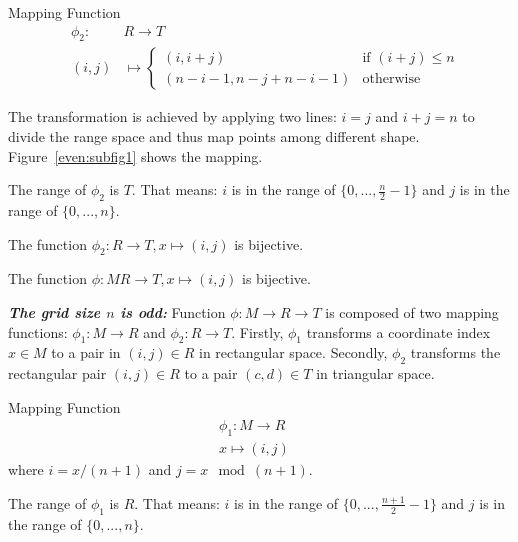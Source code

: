 \documentclass[AMA,LATO1COL]{WileyNJD-v2}
\begin{document}
\begin{definition}
Mapping Function
\begin{eqnarray}
&\phi_2:&   R \rightarrow  T  \\
&(i,j)& \mapsto
  \begin{cases}
   (i,i+j) & \text{if } (i+j) \leq n \\
   (n-i-1,n-j+n-i-1) & \text{otherwise}
  \end{cases}
\end{eqnarray}
\end{definition}
The transformation is achieved by applying two lines: $i=j$ and $i+j=n$ to divide the range space and thus map points among different shape. Figure~\ref{even:subfig1} shows the mapping.

\vspace{5mm}
\begin{lemma}
The range of $\phi_2$ is $T$. That means: $i$ is in the range of  $\{0,...,\frac{n}{2}-1\}$ and $j$ is in the range of $\{0,...,n\}$.
\end{lemma}
\vspace{5mm}
\begin{lemma}
The function $\phi_2:   R \rightarrow  T,x \mapsto (i,j)$ is bijective.
\end{lemma}
\vspace{5mm}
\begin{corollary}
The function $\phi:   M   R \rightarrow  T,x \mapsto (i,j)$ is bijective.
\end{corollary}
\vspace{5mm}
\noindent \textbf{\textit{The grid size $n$ is odd:}} Function $\phi:  M \rightarrow  R \rightarrow  T$ is composed of two mapping functions: $\phi_1:  M \rightarrow  R$ and $\phi_2:  R \rightarrow  T$. Firstly, $\phi_1$ transforms a coordinate index $x\in  M$ to a pair in $(i,j)\in  R$ in rectangular space. Secondly, $\phi_2$ transforms the rectangular pair $(i,j)\in  R$ to a pair $(c,d)\in  T$ in triangular space.
\vspace{5mm}
\noindent\begin{definition}
Mapping Function
\begin{eqnarray}
\phi_1:   M \rightarrow  R & \\
x \mapsto (i,j)
\end{eqnarray}
 where  $i  = x / (n+1)$ and $j = x \mod (n+1)$.
\end{definition}
 \vspace{5mm}
\begin{lemma}
The range of $\phi_1$ is $R$. That means: $i$ is in the range of  $\{0,...,\frac{n+1}{2}-1\}$ and $j$ is in the range of $\{0,...,n\}$.
\end{lemma}
\end{document}
